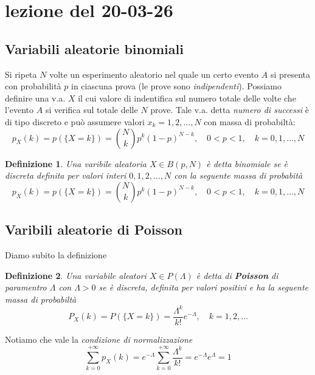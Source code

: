 \documentclass[11pt,a4paper]{article}
\newtheorem{definition}{Definizione}[section]
\begin{document}
\section{lezione del 20-03-26}
\subsection{Variabili aleatorie binomiali}\label{sub:Variabili aleatorie binomiali} %
Si ripeta $N$ volte un esperimento aleatorio nel quale un certo evento $A$ si presenta
con probabilità $p$ in ciascuna prova (le prove sono \textit{indipendenti}).
Possiamo definire una v.a. $X$ il cui valore di indentifica sul numero totale delle volte
che l'evento $A$ si verifica sul totale delle $N$ prove. Tale v.a. detta \textit{numero di successi} è di 
tipo discreto e può assumere valori $x_k = 1,2, \dots, N$ con massa di probabiltà:
\[
    p_X(k) = p(\{X = k\}) = \binom{N}{k}p^k(1 - p)^{N-k}, \quad 0 < p < 1,\quad k = 0, 1, \dots, N
\]
\begin{definition}\label{variabile aleatorio binomiale}
    Una varibile aleatoria $X \in B(p, N)$ è detta binomiale se è discreta 
    definita per valori interi $0, 1, 2, \dots, N$  con la seguente massa di probabità
    \begin{displaymath}
                p_X(k) = p(\{X = k\}) = \binom{N}{k}p^k(1 - p)^{N-k}, \quad 0 < p < 1,\quad k = 0, 1, \dots, N 
    \end{displaymath}
\end{definition}
\subsection{Varibili aleatorie di Poisson}\label{sub:Varibili aleatorie di Poisson} %
Diamo subito la definizione
\begin{definition}\label{variabile aleatorio di Poisson}
    Una variabile aleatori $X \in P(\Lambda)$ è detta di \textbf{Poisson} di paramentro $\Lambda$ con $\Lambda > 0$ 
    se è discreta, definita per valori positivi e ha la seguente massa di probabiltà
    \begin{displaymath}
        P_X(k) =P(\{X = k\}) = \frac{\Lambda^k}{k!}e^{-\Lambda}, \quad k = 1, 2, \dots 
    \end{displaymath}
\end{definition}
Notiamo che vale la \textit{condizione di normalizzazione}
\[
    \sum_{k = 0}^{+\infty}p_X(k) = e^{-\Lambda} \sum_{k = 0}^{+\infty}\frac{\Lambda^k}{k!} = e^{-\Lambda}e^{\Lambda} = 1
\]
\end{document}
